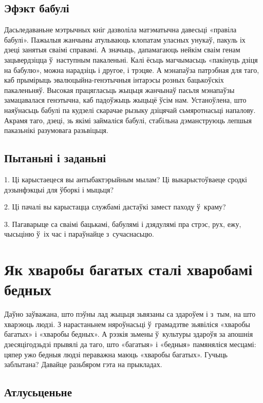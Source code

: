 \subsection*{Эфэкт бабулі}

Дасьледаваньне мэтрычных кніг дазволіла матэматычна давесьці «правіла бабулі». Пажылыя жанчыны атульваюць клопатам уласных унукаў, пакуль іх дзеці занятыя сваімі справамі. А значыць, дапамагаюць нейкім сваім генам зацьвердзіцца ў~наступным пакаленьні. Калі ёсьць магчымасьць «пакінуць дзіця на бабулю», можна нарадзіць і другое, і трэцяе. А мэнапаўза патрэбная для таго, каб прымірыць эвалюцыйна-генэтычныя інтарэсы розных бацькоўскіх пакаленьняў. Высокая працягласьць жыцьця жанчынаў пасьля мэнапаўзы замацавалася генэтычна, каб падоўжыць жыцьцё ўсім нам. Устаноўлена, што наяўнасьць бабулі па кудзелі скарачае рызыку дзіцячай сьмяротнасьці напалову. Акрамя таго, дзеці, зь якімі займаліся бабулі, стабільна дэманструюць лепшыя паказьнікі разумовага разьвіцьця.

\subsection*{Пытаньні і заданьні}

1. Ці карыстаецеся вы антыбактэрыйным мылам? Ці выкарыстоўваеце сродкі дэзынфэкцыі для ўборкі і мыцьця?

2. Ці пачалі вы карыстацца службамі дастаўкі замест паходу ў~краму?

3. Пагаварыце са сваімі бацькамі, бабулямі і дзядулямі пра стрэс, рух, ежу, чысьціню ў~іх час і параўнайце з~сучаснасьцю.


\section{Як хваробы багатых сталі хваробамі бедных}

Даўно заўважана, што пэўны лад жыцьця зьвязаны са здароўем і з~тым, на што хварэюць людзі. З нарастаньнем няроўнасьці ў~грамадзтве зьявіліся «хваробы багатых» і «хваробы бедных». А рэзкія зьмены ў~культуры здароўя за апошнія дзесяцігодзьдзі прывялі да таго, што «багатыя» і «бедныя» памяняліся месцамі: цяпер ужо бедныя людзі пераважна маюць «хваробы багатых». Гучыць заблытана? Давайце разьбяром гэта на прыкладах.

\subsection*{Атлусьценьне}

